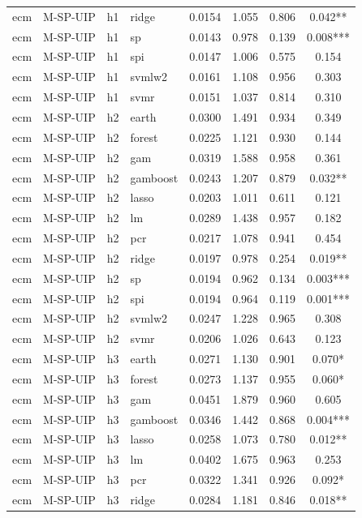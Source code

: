 \begin{ThreePartTable}
\begin{longtable}[t]{llclcccc}
ecm & M-SP-UIP & h1 & ridge & 0.0154 & 1.055 & 0.806 & 0.042**\\
ecm & M-SP-UIP & h1 & sp & 0.0143 & 0.978 & 0.139 & 0.008***\\
ecm & M-SP-UIP & h1 & spi & 0.0147 & 1.006 & 0.575 & 0.154\\
ecm & M-SP-UIP & h1 & svmlw2 & 0.0161 & 1.108 & 0.956 & 0.303\\
ecm & M-SP-UIP & h1 & svmr & 0.0151 & 1.037 & 0.814 & 0.310\\
\addlinespace
ecm & M-SP-UIP & h2 & earth & 0.0300 & 1.491 & 0.934 & 0.349\\
ecm & M-SP-UIP & h2 & forest & 0.0225 & 1.121 & 0.930 & 0.144\\
ecm & M-SP-UIP & h2 & gam & 0.0319 & 1.588 & 0.958 & 0.361\\
ecm & M-SP-UIP & h2 & gamboost & 0.0243 & 1.207 & 0.879 & 0.032**\\
ecm & M-SP-UIP & h2 & lasso & 0.0203 & 1.011 & 0.611 & 0.121\\
ecm & M-SP-UIP & h2 & lm & 0.0289 & 1.438 & 0.957 & 0.182\\
ecm & M-SP-UIP & h2 & pcr & 0.0217 & 1.078 & 0.941 & 0.454\\
ecm & M-SP-UIP & h2 & ridge & 0.0197 & 0.978 & 0.254 & 0.019**\\
ecm & M-SP-UIP & h2 & sp & 0.0194 & 0.962 & 0.134 & 0.003***\\
ecm & M-SP-UIP & h2 & spi & 0.0194 & 0.964 & 0.119 & 0.001***\\
ecm & M-SP-UIP & h2 & svmlw2 & 0.0247 & 1.228 & 0.965 & 0.308\\
ecm & M-SP-UIP & h2 & svmr & 0.0206 & 1.026 & 0.643 & 0.123\\
\addlinespace
ecm & M-SP-UIP & h3 & earth & 0.0271 & 1.130 & 0.901 & 0.070*\\
ecm & M-SP-UIP & h3 & forest & 0.0273 & 1.137 & 0.955 & 0.060*\\
ecm & M-SP-UIP & h3 & gam & 0.0451 & 1.879 & 0.960 & 0.605\\
ecm & M-SP-UIP & h3 & gamboost & 0.0346 & 1.442 & 0.868 & 0.004***\\
ecm & M-SP-UIP & h3 & lasso & 0.0258 & 1.073 & 0.780 & 0.012**\\
ecm & M-SP-UIP & h3 & lm & 0.0402 & 1.675 & 0.963 & 0.253\\
ecm & M-SP-UIP & h3 & pcr & 0.0322 & 1.341 & 0.926 & 0.092*\\
ecm & M-SP-UIP & h3 & ridge & 0.0284 & 1.181 & 0.846 & 0.018**\\

\end{longtable}
\end{ThreePartTable}
